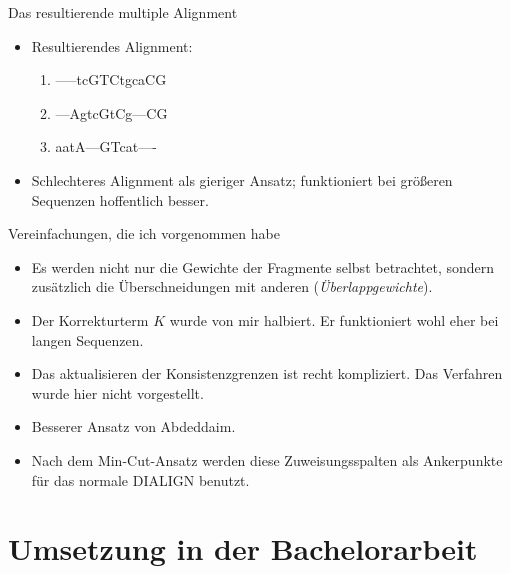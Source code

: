 \documentclass[wide,xcolor={x11names},hyperref={colorlinks=false},pantone312]{beamer}
\begin{document}
\begin{frame}[t]{Das resultierende multiple Alignment}
\begin{itemize}
\begin{center}
			\end{center}
		\item Resultierendes Alignment:
			\ttfamily
			\begin{enumerate}
				\item -----tcGTCtgcaCG
				\item ---AgtcGtCg---CG
				\item aatA---GTcat----
			\end{enumerate}
		\normalfont
		\item Schlechteres Alignment als gieriger Ansatz; funktioniert bei größeren Sequenzen hoffentlich besser.
	\end{itemize}
\end{frame}

\begin{frame}[t]{Vereinfachungen, die ich vorgenommen habe}
	\begin{itemize}
		\item Es werden nicht nur die Gewichte der Fragmente selbst betrachtet, sondern zusätzlich die Überschneidungen mit anderen (\emph{Überlappgewichte}).
		\item Der Korrekturterm $K$ wurde von mir halbiert. Er funktioniert wohl eher bei langen Sequenzen.
		\item Das aktualisieren der Konsistenzgrenzen ist recht kompliziert. Das Verfahren wurde hier nicht vorgestellt. \cite{MDW96}
		\item Besserer Ansatz von Abdeddaim. \cite{A97}
		\item Nach dem Min-Cut-Ansatz werden diese Zuweisungsspalten als Ankerpunkte für das normale DIALIGN benutzt. \cite{MPPS06}
	\end{itemize}
\end{frame}

\section{Umsetzung in der Bachelorarbeit}
\end{document}
